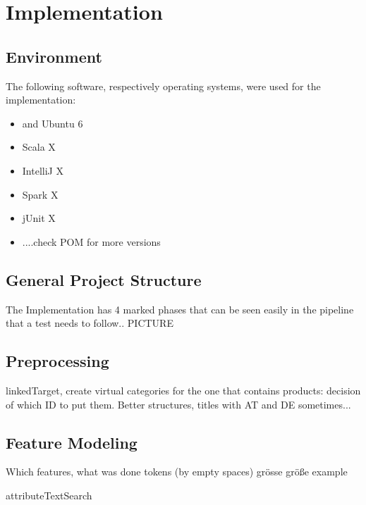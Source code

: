 \chapter{Implementation\label{cha:chapter5}}



\section{Environment\label{sec:env}}
The following software, respectively operating systems, were used for the implementation:

\begin{itemize}
		\item and Ubuntu 6
		\vspace{-0.1in} 
		\item Scala X
		\vspace{-0.1in} 
		\item IntelliJ X
		\vspace{-0.1in} 
		\item Spark X
		\vspace{-0.1in} 
		\item jUnit X
		\vspace{-0.1in} 
		\item ....check POM for more versions
\end{itemize}

\section{General Project Structure\label{sec:projectstructure}}

The Implementation has 4 marked phases that can be seen easily in the pipeline that a test needs to follow.. PICTURE

\section{Preprocessing}
linkedTarget, create virtual categories for the one that contains products: decision of which ID to put them. 
Better structures, titles with AT and DE sometimes...

\section{Feature Modeling}
Which features, what was done
tokens (by empty spaces)
gr\"osse gr\"oße example

attributeTextSearch

